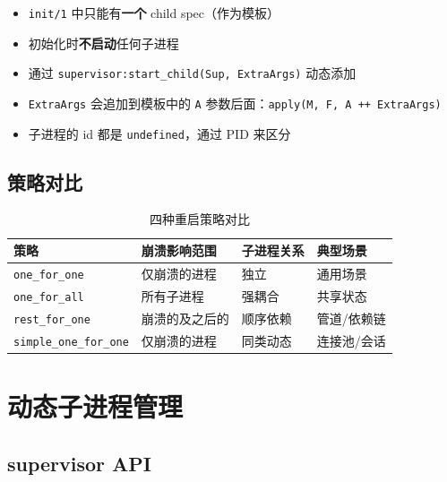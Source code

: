 \documentclass[a4paper,11pt]{article}
\begin{document}
\begin{notebox}
\begin{itemize}[leftmargin=1.5em]
    \item \texttt{init/1} 中只能有\textbf{一个} child spec（作为模板）
    \item 初始化时\textbf{不启动}任何子进程
    \item 通过 \texttt{supervisor:start\_child(Sup, ExtraArgs)} 动态添加
    \item \texttt{ExtraArgs} 会追加到模板中的 \texttt{A} 参数后面：\texttt{apply(M, F, A ++ ExtraArgs)}
    \item 子进程的 id 都是 \texttt{undefined}，通过 PID 来区分
\end{itemize}
\end{notebox}

\subsection{策略对比}

\begin{table}[H]
\centering
\begin{tabular}{@{}llll@{}}
\toprule
\textbf{策略} & \textbf{崩溃影响范围} & \textbf{子进程关系} & \textbf{典型场景} \\
\midrule
\texttt{one\_for\_one} & 仅崩溃的进程 & 独立 & 通用场景 \\
\texttt{one\_for\_all} & 所有子进程 & 强耦合 & 共享状态 \\
\texttt{rest\_for\_one} & 崩溃的及之后的 & 顺序依赖 & 管道/依赖链 \\
\texttt{simple\_one\_for\_one} & 仅崩溃的进程 & 同类动态 & 连接池/会话 \\
\bottomrule
\end{tabular}
\caption{四种重启策略对比}
\end{table}


\section{动态子进程管理}

\subsection{supervisor API}
\end{document}
